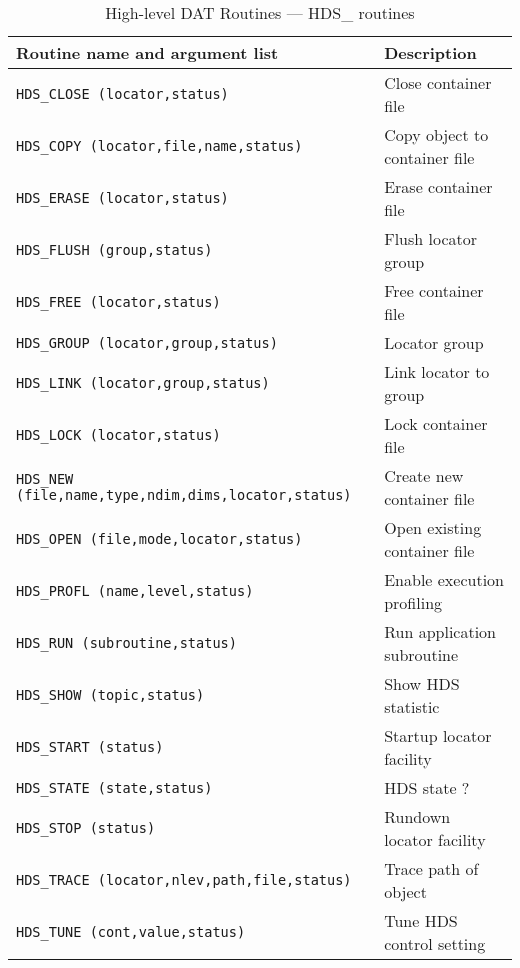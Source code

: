 \begin {table}[htbp]
\begin {center}
\begin {tabular}{||l|l||}
\hline
Routine name and argument list		& Description \\
\hline    
{\tt HDS\_CLOSE (locator,status)}	& Close container file \\
{\tt HDS\_COPY (locator,file,name,status)} & Copy object to container file \\
{\tt HDS\_ERASE (locator,status)}	& Erase container file \\
{\tt HDS\_FLUSH (group,status)}	& Flush locator group \\
{\tt HDS\_FREE (locator,status)}	& Free container file \\
{\tt HDS\_GROUP (locator,group,status)}	& Locator group \\
{\tt HDS\_LINK (locator,group,status)}	& Link locator to group\\
{\tt HDS\_LOCK (locator,status)}	& Lock container file \\
{\tt HDS\_NEW (file,name,type,ndim,dims,locator,status)} & Create new container file \\
{\tt HDS\_OPEN (file,mode,locator,status)} & Open existing container file \\
{\tt HDS\_PROFL (name,level,status)}	& Enable execution profiling \\
{\tt HDS\_RUN (subroutine,status)}	& Run application subroutine \\
{\tt HDS\_SHOW (topic,status)}		& Show HDS statistic \\
{\tt HDS\_START (status)}		& Startup locator facility \\
{\tt HDS\_STATE (state,status)}		& HDS state ? \\
{\tt HDS\_STOP (status)}		& Rundown locator facility \\
{\tt HDS\_TRACE (locator,nlev,path,file,status)} & Trace path of object \\
{\tt HDS\_TUNE (cont,value,status)}	& Tune HDS control setting \\
\hline
\end {tabular}
\caption {High-level DAT Routines --- HDS\_ routines}
\label {high_level_dat_routines_hds_routines}
\end {center}
\end {table}

